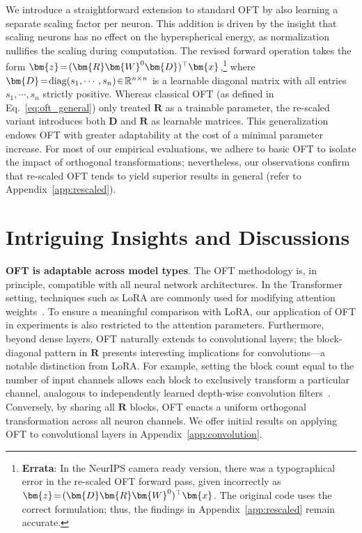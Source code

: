 {We introduce a straightforward extension to standard OFT by also learning a separate scaling factor per neuron. This addition is driven by the insight that scaling neurons has no effect on the hyperspherical energy, as normalization nullifies the scaling during computation. The revised forward operation takes the form $\thickmuskip=2mu \medmuskip=2mu\bm{z}=(\bm{R}\bm{W}^0\bm{D})^\top\bm{x}$,\footnote{\textbf{Errata}: In the NeurIPS camera ready version, there was a typographical error in the re-scaled OFT forward pass, given incorrectly as $\thickmuskip=2mu \medmuskip=2mu\bm{z}=(\bm{D}\bm{R}\bm{W}^0)^\top\bm{x}$. The original code uses the correct formulation; thus, the findings in Appendix~\ref{app:rescaled} remain accurate.} where $\thickmuskip=2mu \medmuskip=2mu \bm{D}=\text{diag}(s_1,\cdots,s_n)\in\mathbb{R}^{n\times n}$ is a learnable diagonal matrix with all entries $s_1,\cdots,s_n$ strictly positive. Whereas classical OFT (as defined in Eq.~\eqref{eq:oft_general}) only treated $\bm{R}$ as a trainable parameter, the re-scaled variant introduces both $\bm{D}$ and $\bm{R}$ as learnable matrices. This generalization endows OFT with greater adaptability at the cost of a minimal parameter increase. For most of our empirical evaluations, we adhere to basic OFT to isolate the impact of orthogonal transformations; nevertheless, our observations confirm that re-scaled OFT tends to yield superior results in general (refer to Appendix~\ref{app:rescaled}).

\section{Intriguing Insights and Discussions}

\textbf{OFT is adaptable across model types}. The OFT methodology is, in principle, compatible with all neural network architectures. In the Transformer setting, techniques such as LoRA are commonly used for modifying attention weights~\cite{hulora2022}. To ensure a meaningful comparison with LoRA, our application of OFT in experiments is also restricted to the attention parameters. Furthermore, beyond dense layers, OFT naturally extends to convolutional layers; the block-diagonal pattern in $\bm{R}$ presents interesting implications for convolutions—a notable distinction from LoRA. For example, setting the block count equal to the number of input channels allows each block to exclusively transform a particular channel, analogous to independently learned depth-wise convolution filters~\cite{chollet2017xception}. Conversely, by sharing all $\bm{R}$ blocks, OFT enacts a uniform orthogonal transformation across all neuron channels. We offer initial results on applying OFT to convolutional layers in Appendix~\ref{app:convolution}.

}
